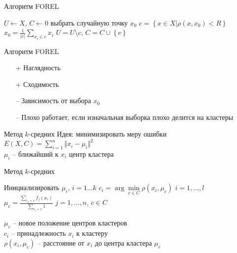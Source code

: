\documentclass[10pt]{beamer}
\begin{document}
\begin{frame}{Алгоритм FOREL}
	\begin{algorithmic}[1]
            \State ${U \gets X}$, $C \gets 0$
                \State выбрать случайную точку $x_0$
                		\State ${c = \left\{ x \in X \vert \rho(x, x_0) < R \right\}}$
                		\State $x_0 = \frac{1}{\vert c \vert} \sum\limits_{x_i \in c} x_i$
                	\EndRepeat
    		        \State ${U = U \setminus c}$, ${C = C \cup \left\{ c \right\}}$
            \EndWhile            
        \EndFunction
    \end{algorithmic}
\end{frame}

\begin{frame}{Алгоритм FOREL}
	\begin{itemize} [<+- | alert@+>]
		\item[+] Наглядность
		\item[+] Сходимость
		\bigbreak
		\item[--] Зависимость от выбора $x_0$
		\item[--] Плохо работает, если изначальная выборка плохо делится на кластеры
	\end{itemize}
\end{frame}


\begin{frame}{Метод $k$-средних}
	\alert{Идея}:  минимизировать меру ошибки\\
	\bigbreak
	${E(X, C) = \sum\limits_{i = 1}^n \Vert x_i -\mu_i \Vert^2}$\\
	\bigbreak
	$\mu_i$ -- ближайший к $x_i$ центр кластера
\end{frame}

\begin{frame}{Метод $k$-средних}
	\begin{algorithmic}[1]
            \State Инициализировать $\mu_i$, $i = 1 \dots k$
                \State $c_i = \arg\min\limits_{c \in C} \rho(x_i, \mu_c)$ \hspace{5mm} $i = 1,\dots, l$
                \State ${\mu_c = \frac{\sum\limits_{c_i = c} f_j(x_i)}{\sum\limits_{c_i = c} 1} }$ \hspace{10mm} $j = 1,\dots, n$, $c \in C$
             \EndRepeat
        \EndFunction
    \end{algorithmic}    
	\bigbreak
	\bigbreak
	$\mu_c$ -- новое положение центров кластеров\\
	$c_i$ -- принадлежность $x_i$ к кластеру\\
	$\rho(x_i, \mu_c)$ -- расстояние от $x_i$ до центра кластера $\mu_c$
\end{frame}
\end{document}
